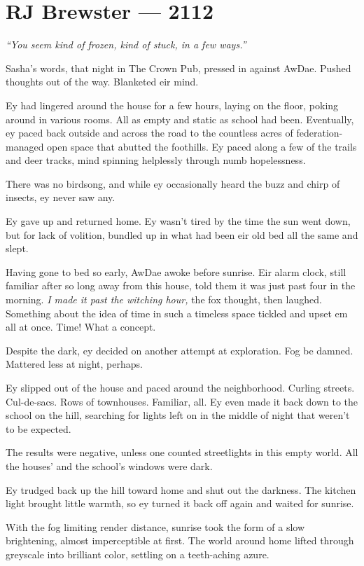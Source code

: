 \hypertarget{rj-brewster-2112}{%
\chapter*{RJ Brewster — 2112}\label{rj-brewster-2112}}

\emph{``You seem kind of frozen, kind of stuck, in a few ways.''}

Sasha's words, that night in The Crown Pub, pressed in against AwDae. Pushed thoughts out of the way. Blanketed eir mind.

Ey had lingered around the house for a few hours, laying on the floor, poking around in various rooms. All as empty and static as school had been. Eventually, ey paced back outside and across the road to the countless acres of federation-managed open space that abutted the foothills. Ey paced along a few of the trails and deer tracks, mind spinning helplessly through numb hopelessness.

There was no birdsong, and while ey occasionally heard the buzz and chirp of insects, ey never saw any.

Ey gave up and returned home. Ey wasn't tired by the time the sun went down, but for lack of volition, bundled up in what had been eir old bed all the same and slept.

Having gone to bed so early, AwDae awoke before sunrise. Eir alarm clock, still familiar after so long away from this house, told them it was just past four in the morning. \emph{I made it past the witching hour,} the fox thought, then laughed. Something about the idea of time in such a timeless space tickled and upset em all at once. Time! What a concept.

Despite the dark, ey decided on another attempt at exploration. Fog be damned. Mattered less at night, perhaps.

Ey slipped out of the house and paced around the neighborhood. Curling streets. Cul-de-sacs. Rows of townhouses. Familiar, all. Ey even made it back down to the school on the hill, searching for lights left on in the middle of night that weren't to be expected.

The results were negative, unless one counted streetlights in this empty world. All the houses' and the school's windows were dark.

Ey trudged back up the hill toward home and shut out the darkness. The kitchen light brought little warmth, so ey turned it back off again and waited for sunrise.

With the fog limiting render distance, sunrise took the form of a slow brightening, almost imperceptible at first. The world around home lifted through greyscale into brilliant color, settling on a teeth-aching azure.


